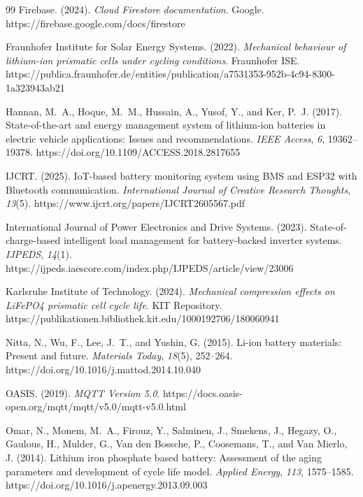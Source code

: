 \documentclass[12pt, a4paper]{report}
\begin{document}
{\begin{thebibliography}{99}
Firebase. (2024).
\textit{Cloud Firestore documentation}.
Google. https://firebase.google.com/docs/firestore

Fraunhofer Institute for Solar Energy Systems. (2022).
\textit{Mechanical behaviour of lithium-ion prismatic cells under cycling
conditions}.
Fraunhofer ISE. https://publica.fraunhofer.de/entities/publication/a7531353-952b-4c94-8300-1a323943ab21

Hannan, M.~A., Hoque, M.~M., Hussain, A., Yusof, Y., and Ker, P.~J. (2017).
State-of-the-art and energy management system of lithium-ion batteries in
electric vehicle applications: Issues and recommendations.
\textit{IEEE Access}, \textit{6}, 19362--19378.
https://doi.org/10.1109/ACCESS.2018.2817655

IJCRT. (2025).
IoT-based battery monitoring system using BMS and ESP32 with Bluetooth
communication.
\textit{International Journal of Creative Research Thoughts}, \textit{13}(5).
https://www.ijcrt.org/papers/IJCRT2605567.pdf

International Journal of Power Electronics and Drive Systems. (2023).
State-of-charge-based intelligent load management for battery-backed
inverter systems.
\textit{IJPEDS}, \textit{14}(1).
https://ijpeds.iaescore.com/index.php/IJPEDS/article/view/23006

Karlsruhe Institute of Technology. (2024).
\textit{Mechanical compression effects on LiFePO4 prismatic cell cycle life}.
KIT Repository.
https://publikationen.bibliothek.kit.edu/1000192706/180060941

Nitta, N., Wu, F., Lee, J.~T., and Yushin, G. (2015).
Li-ion battery materials: Present and future.
\textit{Materials Today}, \textit{18}(5), 252--264.
https://doi.org/10.1016/j.mattod.2014.10.040

OASIS. (2019).
\textit{MQTT Version 5.0}.
https://docs.oasis-open.org/mqtt/mqtt/v5.0/mqtt-v5.0.html

Omar, N., Monem, M.~A., Firouz, Y., Salminen, J., Smekens, J., Hegazy, O.,
Gaulous, H., Mulder, G., Van den Bossche, P., Coosemans, T., and
Van Mierlo, J. (2014).
Lithium iron phosphate based battery: Assessment of the aging parameters and
development of cycle life model.
\textit{Applied Energy}, \textit{113}, 1575--1585.
https://doi.org/10.1016/j.apenergy.2013.09.003


\end{thebibliography}}
\end{document}
